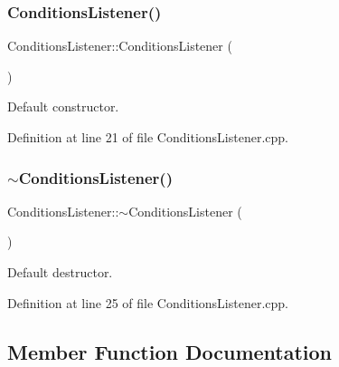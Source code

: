 \subsubsection{\texorpdfstring{Conditions\+Listener()}{ConditionsListener()}}
{\footnotesize\ttfamily Conditions\+Listener\+::\+Conditions\+Listener (\begin{DoxyParamCaption}{ }\end{DoxyParamCaption})}



Default constructor. 



Definition at line 21 of file Conditions\+Listener.\+cpp.

\hypertarget{class_d_d4hep_1_1_conditions_1_1_conditions_listener_a75358af2c660cee415619ba50c2bea74}{}\label{class_d_d4hep_1_1_conditions_1_1_conditions_listener_a75358af2c660cee415619ba50c2bea74} 
\subsubsection{\texorpdfstring{$\sim$\+Conditions\+Listener()}{~ConditionsListener()}}
{\footnotesize\ttfamily Conditions\+Listener\+::$\sim$\+Conditions\+Listener (\begin{DoxyParamCaption}{ }\end{DoxyParamCaption})\hspace{0.3cm}{\ttfamily [virtual]}}



Default destructor. 



Definition at line 25 of file Conditions\+Listener.\+cpp.



\subsection{Member Function Documentation}
\hypertarget{class_d_d4hep_1_1_conditions_1_1_conditions_listener_a848d047b6a957987ea1a8256e6efd75a}{}\label{class_d_d4hep_1_1_conditions_1_1_conditions_listener_a848d047b6a957987ea1a8256e6efd75a} 
